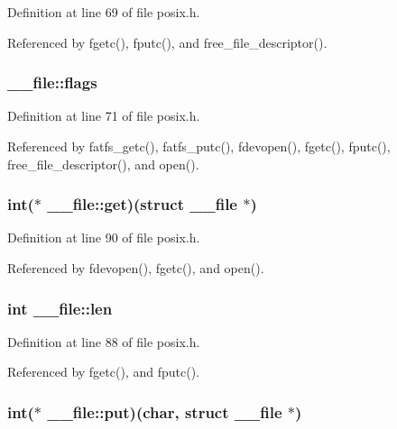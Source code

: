 Definition at line 69 of file posix.\-h.



Referenced by fgetc(), fputc(), and free\-\_\-file\-\_\-descriptor().

\hypertarget{struct____file_a8d11df8679502efee09740f97d7c277b}{
\subsubsection[{flags}]{ \-\_\-\-\_\-file\-::flags}}\label{struct____file_a8d11df8679502efee09740f97d7c277b}


Definition at line 71 of file posix.\-h.



Referenced by fatfs\-\_\-getc(), fatfs\-\_\-putc(), fdevopen(), fgetc(), fputc(), free\-\_\-file\-\_\-descriptor(), and open().

\hypertarget{struct____file_a467262b28adfee5f6fb6df42de293071}{
\subsubsection[{get}]{\setlength{\rightskip}{0pt plus 5cm}int($\ast$ \-\_\-\-\_\-file\-::get)(struct {\bf \-\_\-\-\_\-file} $\ast$)}}\label{struct____file_a467262b28adfee5f6fb6df42de293071}


Definition at line 90 of file posix.\-h.



Referenced by fdevopen(), fgetc(), and open().

\hypertarget{struct____file_a30309efd13a75ed510bb2370debafaf8}{
\subsubsection[{len}]{\setlength{\rightskip}{0pt plus 5cm}int \-\_\-\-\_\-file\-::len}}\label{struct____file_a30309efd13a75ed510bb2370debafaf8}


Definition at line 88 of file posix.\-h.



Referenced by fgetc(), and fputc().

\hypertarget{struct____file_ac30baaec720d36ed503f35ae50bcec13}{
\subsubsection[{put}]{\setlength{\rightskip}{0pt plus 5cm}int($\ast$ \-\_\-\-\_\-file\-::put)(char, struct {\bf \-\_\-\-\_\-file} $\ast$)}}\label{struct____file_ac30baaec720d36ed503f35ae50bcec13}


